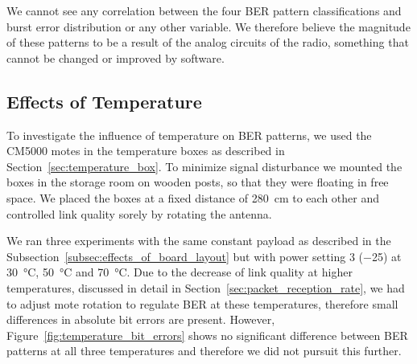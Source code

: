 We cannot see any correlation between the four \ac{BER} pattern classifications and burst error distribution or any other variable.
We therefore believe the magnitude of these patterns to be a result of the analog circuits of the radio, something that cannot be changed or improved by software.

\subsection{Effects of Temperature}
\label{subsec:effects_of_temperature}

To investigate the influence of temperature on \ac{BER} patterns, we used the CM5000 motes in the temperature boxes as described in Section~\ref{sec:temperature_box}.
To minimize signal disturbance we mounted the boxes in the storage room on wooden posts, so that they were floating in free space.
We placed the boxes at a fixed distance of \SI{280}{\centi\metre} to each other and controlled link quality sorely by rotating the antenna.

We ran three experiments with the same constant payload as described in the Subsection~\ref{subsec:effects_of_board_layout} but with power setting 3 (\SI{-25}{\dBm}) at \SI{30}{\celsius}, \SI{50}{\celsius} and \SI{70}{\celsius}.
Due to the decrease of link quality at higher temperatures, discussed in detail in Section~\ref{sec:packet_reception_rate}, we had to adjust mote rotation to regulate \ac{BER} at these temperatures, therefore small differences in absolute bit errors are present.
However, Figure~\ref{fig:temperature_bit_errors} shows no significant difference between \ac{BER} patterns at all three temperatures and therefore we did not pursuit this further.

